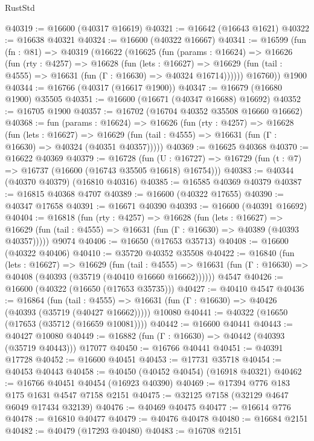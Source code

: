\begin{lexlean}{RustStd}
\begin{coremodule}
{\begin{coremodule}
{{{{{{{{{{{{{{{{{{{{{{{{{{{{{{{{{{{{{{{{{{{{{{{{{{{{{{{@40319 := @16600 (@40317 @16619)
@40321 := @16642 (@16643 @1621)
@40322 := @16638 @40321
@40324 := @16600 (@40322 @16667)
@40341 := @16599
    (fun (fn : @81) =>
    @40319
      (@16622
        (@16625
          (fun (params : @16624) =>
          @16626
            (fun (rty : @4257) =>
            @16628
              (fun (lets : @16627) =>
              @16629 (fun (tail : @4555) => @16631 (fun (Γ : @16630) => @40324 @16714))))))
        @16760))
    @1900
@40344 := @16766 (@40317 (@16617 @1900))
@40347 := @16679 (@16680 @1900) @35505
@40351 := @16600 (@16671 (@40347 @16688) @16692)
@40352 := @16705 @1900
@40357 := @16702 (@16704 @40352 @35508 @16660 @16662)
@40368 := fun (params : @16624) =>
  @16626
    (fun (rty : @4257) =>
    @16628
      (fun (lets : @16627) =>
      @16629 (fun (tail : @4555) => @16631 (fun (Γ : @16630) => @40324 (@40351 @40357)))))
@40369 := @16625 @40368
@40370 := @16622 @40369
@40379 := @16728
    (fun (U : @16727) => @16729 (fun (t : @7) => @16737 (@16600 (@16743 @35505 @16618) @16754)))
@40383 := @40344 (@40370 @40379) (@16810 @40316)
@40385 := @16585 @40369 @40379
@40387 := @16815 @40368 @4707
@40389 := @16600 (@40322 @17655)
@40390 := @40347 @17658
@40391 := @16671 @40390
@40393 := @16600 (@40391 @16692)
@40404 := @16818
    (fun (rty : @4257) =>
    @16628
      (fun (lets : @16627) =>
      @16629 (fun (tail : @4555) => @16631 (fun (Γ : @16630) => @40389 (@40393 @40357)))))
    @9074
@40406 := @16650 (@17653 @35713)
@40408 := @16600 (@40322 @40406)
@40410 := @35720 @40352 @35508
@40422 := @16840
    (fun (lets : @16627) =>
    @16629
      (fun (tail : @4555) =>
      @16631 (fun (Γ : @16630) => @40408 (@40393 (@35719 (@40410 @16660 @16662))))))
    @4547
@40426 := @16600 (@40322 (@16650 (@17653 @35735)))
@40427 := @40410 @4547
@40436 := @16864
    (fun (tail : @4555) => @16631 (fun (Γ : @16630) => @40426 (@40393 (@35719 (@40427 @16662)))))
    @10080
@40441 := @40322 (@16650 (@17653 (@35712 (@16659 @10081))))
@40442 := @16600 @40441
@40443 := @40427 @10080
@40449 := @16882 (fun (Γ : @16630) => @40442 (@40393 (@35719 @40443))) @17077
@40450 := @16766 @40441
@40451 := @40391 @17728
@40452 := @16600 @40451
@40453 := @17731 @35718
@40454 := @40453 @40443
@40458 := @40450 (@40452 @40454) (@16918 @40321)
@40462 := @16766 @40451 @40454 (@16923 @40390)
@40469 := @17394 @776 @183 @175 @1631 @4547 @7158 @2151
@40475 := @32125 @7158 (@32129 @4647 @6049 @17434 @32139)
@40476 := @40469 @40475
@40477 := @16614 @776
@40478 := @16810 @40477
@40479 := @40476 @40478
@40480 := @16684 @2151
@40482 := @40479 (@17293 @40480)
@40483 := @16708 @2151
}}}}}}}}}}}}}}}}}}}}}}}}}}}}}}}}}}}}}}}}}}}}}}}}}}}}}}}
\end{coremodule}}
\end{coremodule}
\end{lexlean}
